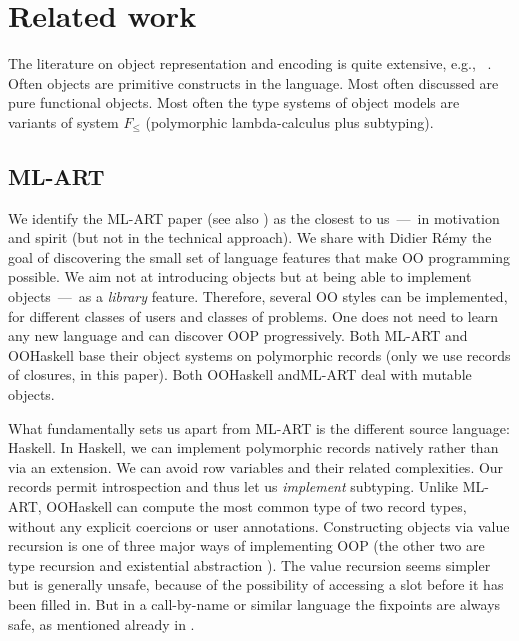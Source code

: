 \medskip

\section{Related work}
\label{S:related}

The literature on object representation and encoding is quite
extensive, e.g., ~\cite{Cardelli-on-understanding,
Poll97,AC96,Ohori95,PT94,BM92}.  Often objects are primitive
constructs in the language.  Most often discussed are pure functional
objects. Most often the type systems of object models are variants of
system $F_{\leq}$ (polymorphic lambda-calculus plus subtyping).

\medskip

\subsection{ML-ART}

We identify the {ML-ART} paper \cite{ML-ART} (see also
\cite{RV97}) as the closest to us~---~in motivation and spirit (but
not in the technical approach). We share with Didier R{\'e}my the goal
of discovering the small set of language features that make OO
programming possible. We aim not at introducing objects but at being
able to implement objects~---~as a \emph{library} feature. Therefore,
several OO styles can be implemented, for different classes of users
and classes of problems. One does not need to learn any new language
and can discover OOP progressively. Both {ML-ART} and OOHaskell base
their object systems on polymorphic records (only we use records of
closures, in this paper). Both OOHaskell and{ML-ART} deal with
mutable objects.

What fundamentally sets us apart from {ML-ART} is the different source
language: Haskell. In Haskell, we can implement polymorphic records
natively rather than via an extension. We can avoid row variables and
their related complexities. Our records permit introspection and thus
let us \emph{implement} subtyping. Unlike {ML-ART}, OOHaskell can
compute the most common type of two record types, without any explicit
coercions or user annotations.  Constructing objects via
value recursion is one of three major ways of implementing OOP (the
other two are type recursion and existential abstraction
\cite{PT94}). The value recursion seems simpler but is generally
unsafe, because of the possibility of accessing a slot before it has
been filled in. But in a call-by-name or similar language the
fixpoints are always safe, as mentioned already in \cite{ML-ART}.
 
